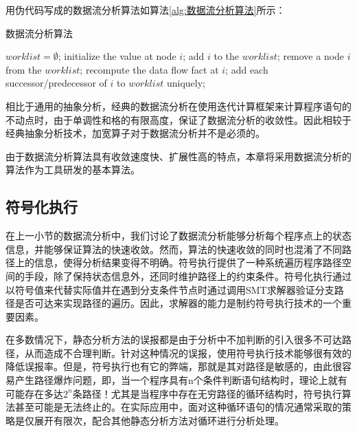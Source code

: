  用伪代码写成的数据流分析算法\cite{cooper2004iterative}如算法\ref{alg:数据流分析算法}所示：
 
 \begin{algorithm}[H]
 	\caption{数据流分析算法}
 	\label{alg:数据流分析算法}
 	\begin{algorithmic}[1]
 		
 		\State $ worklist = \emptyset $;
 		\State initialize the value at node $ i $;
 		\State add $ i $ to the $ worklist $;
 		\EndFor
 		\State remove a node $ i $ from the $ worklist $;
 		\State recompute the data flow fact at $ i $;
 		\State add each successor/predecessor of $ i $ to $ worklist $ uniquely;
 		\EndIf
 		\EndWhile
 		\EndProcedure
 		
 	\end{algorithmic}
 \end{algorithm}
 
 相比于通用的抽象分析，经典的数据流分析在使用迭代计算框架来计算程序语句的不动点时，由于单调性和格的有限高度，保证了数据流分析的收敛性。因此相较于经典抽象分析技术，加宽算子对于数据流分析并不是必须的。
 
 由于数据流分析算法具有收敛速度快、扩展性高的特点，本章将采用数据流分析的算法作为工具研发的基本算法。
 
 \subsection{符号化执行}
 
 在上一小节的数据流分析中，我们讨论了数据流分析能够分析每个程序点上的状态信息，并能够保证算法的快速收敛。然而，算法的快速收敛的同时也混淆了不同路径上的信息，使得分析结果变得不明确。符号执行\cite{clarke1976system, king1976symbolic}提供了一种系统遍历程序路径空间的手段，除了保持状态信息外，还同时维护路径上的约束条件。符号化执行通过以符号值来代替实际值并在遇到分支条件节点时通过调用SMT求解器\cite{de2008z3}验证分支路径是否可达来实现路径的遍历。因此，求解器的能力是制约符号执行技术的一个重要因素。
 
 在多数情况下，静态分析方法的误报都是由于分析中不加判断的引入很多不可达路径，从而造成不合理判断。针对这种情况的误报，使用符号执行技术能够很有效的降低误报率。但是，符号执行也有它的弊端，那就是其对路径是敏感的，由此很容易产生路径爆炸问题，即，当一个程序具有n个条件判断语句结构时，理论上就有可能存在多达$ 2^n $条路径！尤其是当程序中存在无穷路径的循环结构时，符号执行算法甚至可能是无法终止的。在实际应用中，面对这种循环语句的情况通常采取的策略是仅展开有限次，配合其他静态分析方法对循环进行分析处理。
 
